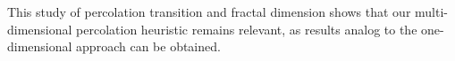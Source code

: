 \documentclass{jimis-en}
\begin{document}


This study of percolation transition and fractal dimension shows that our multi-dimensional percolation heuristic remains relevant, as results analog to the one-dimensional approach can be obtained.  

\end{document}
